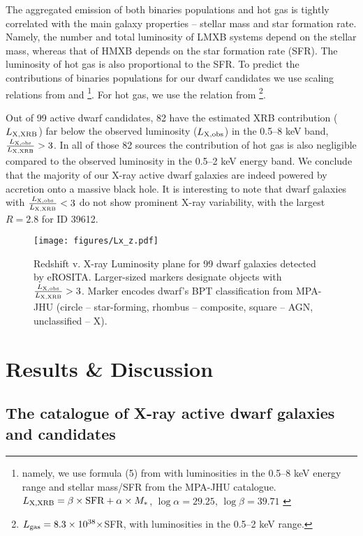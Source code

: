 \documentclass[fleqn,usenatbib]{mnras}
\newcommand{\lxlxrbrat}{\frac{L_{\rm X, obs}}{L_{\rm X, XRB}}}
\begin{document}
The aggregated emission of both binaries populations and hot gas is tightly correlated with the main galaxy properties -- stellar mass and star formation rate. Namely, the number and total luminosity of LMXB systems depend on the stellar mass, whereas that of HMXB depends  on the star formation rate (SFR). The luminosity of hot gas  is also proportional to the SFR. To predict the contributions of binaries populations for our dwarf candidates we use scaling relations from \citet{Lehmer2010} and \citet{Gilfanov2022}\footnote{namely, we use formula (5) from \citealt{Gilfanov2022} with luminosities in the 0.5--8 keV energy range and stellar mass/SFR from the MPA-JHU catalogue. $L_{\rm X, XRB}=\beta\times\text{SFR} + \alpha\times M_*$, $\log\alpha=29.25$, $\log\beta=39.71$ \citep{Lehmer2010}}. For hot gas, we use the relation from \citet{Mineo2012b}\footnote{$L_{\rm gas}=8.3\times10^{38}\times$SFR, with luminosities in the 0.5--2 keV range.}. 

Out of 99 active dwarf candidates, 82 have the estimated XRB contribution ($L_{\rm X,XRB}$) far below the observed luminosity ($L_{\rm X,obs}$) in the 0.5--8 keV band, $\lxlxrbrat>3$. In all of those 82 sources the contribution of hot gas is also negligible compared to the observed luminosity in the 0.5--2 keV energy band. We conclude that the majority of our X-ray active dwarf galaxies are  indeed powered by  accretion onto a massive black hole. It is interesting to note that dwarf galaxies   with $\lxlxrbrat<3$  do not show prominent X-ray variability, with the largest $R=2.8$ for ID 39612.




\begin{figure}
    \texttt{[image: figures/Lx\_z.pdf]}
    \caption[Dwarf galaxies redshift - X-ray luminosity plane.]{Redshift v. X-ray Luminosity plane for 99 dwarf galaxies detected by eROSITA. Larger-sized markers designate objects with $\lxlxrbrat>3$. Marker encodes dwarf's BPT classification from MPA-JHU (circle -- star-forming, rhombus -- composite, square -- AGN, unclassified -- X). }
    \label{fig:Lx_z}
\end{figure}





\section{Results \& Discussion}
\label{sect:results}

\subsection{The catalogue of X-ray active dwarf galaxies and candidates}
\end{document}
